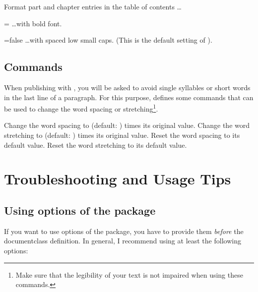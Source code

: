 \begin{optionlist}
   \opt[tocentriesbold] Format part and chapter entries in the table of contents \dots
   \begin{valuelist}
      \item[=\optionvaluedefaultfont{true}] \dots with bold font.
      \item[=false] \dots with spaced low small caps. (This is the default setting of ). 
   \end{valuelist}
\end{optionlist}

\subsection{Commands}

When publishing with \KSP, you will be asked to avoid single syllables or short words in the last line of a paragraph. For this purpose,  defines some commands that can be used to change the word spacing or stretching\footnote{Make sure that the legibility of your text is not impaired when using these commands.}.
\begin{commandlist}
    Change the word spacing to  (default: ) times its original value.
    Change the word stretching to  (default: ) times its original value.
    Reset the word spacing to its default value.
    Reset the word stretching to its default value.
\end{commandlist}

\section{Troubleshooting and Usage Tips}

\subsection{Using options of the  package}

If you want to use options of the  package, you have to provide them \emph{before} the documentclass definition. In general, I recommend using at least the following options:

